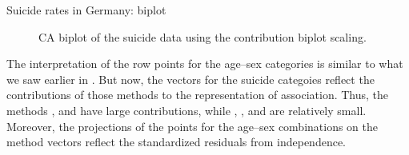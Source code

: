\documentclass[11pt]{book}
\renewenvironment{knitrout}{\small\renewcommand{\baselinestretch}{.85}}{} %
\begin{document}
\begin{Example}[suicide3]{Suicide rates in Germany: biplot}
\begin{knitrout}
\begin{figure}[!htb]
\caption[CA biplot of the suicide data using the contribution biplot scaling]{CA biplot of the suicide data using the contribution biplot scaling.\label{fig:ca-suicide-biplot}}
\end{figure}


\end{knitrout}
The interpretation of the row points for the age--sex categories is similar to what we saw
earlier in .  But now, the vectors for the suicide categoies
reflect the contributions of those methods to the representation of association.
Thus, the methods ,  and  have large contributions, while
, , and  are relatively small.
Moreover, the projections of the points for the age--sex combinations on the method
vectors reflect the standardized residuals from independence.


\end{Example}
\end{document}
